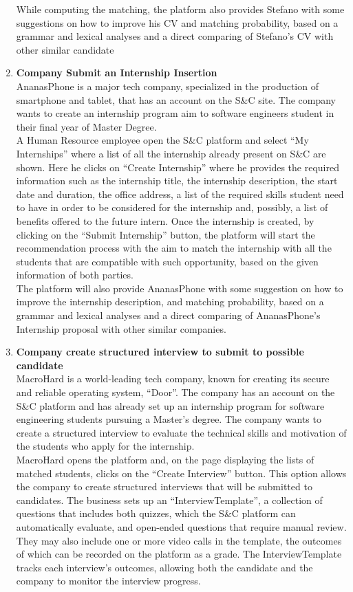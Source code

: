 \begin{enumerate}
        While computing the matching, the platform also provides Stefano with some suggestions on how to improve his CV and matching probability, based on a grammar and lexical analyses and a direct comparing of Stefano's CV with other similar candidate
    \item \textbf{\textcolor{titleColor}{Company Submit an Internship Insertion}}\\
        AnanasPhone is a major tech company, specialized in the production of smartphone and tablet, that has an account on the S\&C site. The company wants to create an internship program aim to software engineers student in their final year of Master Degree.\\
        A Human Resource employee open the S\&C platform and select “My Internships” where a list of all the internship already present on S\&C are shown. Here he clicks on “Create Internship” where he provides the required information such as the internship title, the internship description, the start date and duration, the office address, a list of the required skills student need to have in order to be considered for the internship and, possibly, a list of benefits offered to the future intern. Once the internship is created, by clicking on the “Submit Internship” button, the platform will start the recommendation process with the aim to match the internship with all the students that are compatible with such opportunity, based on the given information of both parties.\\
        The platform will also provide AnanasPhone with some suggestion on how to improve the internship description, and matching probability, based on a grammar and lexical analyses and a direct comparing of AnanasPhone's Internship proposal with other similar companies.
    \item \textbf{\textcolor{titleColor}{Company create structured interview to submit to possible candidate}}\\
        MacroHard is a world-leading tech company, known for creating its secure and reliable operating system, “Door”. The company has an account on the S\&C platform and has already set up an internship program for software engineering students pursuing a Master’s degree. The company wants to create a structured interview to evaluate the technical skills and motivation of the students who apply for the internship.\\
        MacroHard opens the platform and, on the page displaying the lists of matched students, clicks on the “Create Interview” button. This option allows the company to create structured interviews that will be submitted to candidates. The business sets up an “InterviewTemplate”, a collection of questions that includes both quizzes, which the S\&C platform can automatically evaluate, and open-ended questions that require manual review. They may also include one or more video calls in the template, the outcomes of which can be recorded on the platform as a grade. The InterviewTemplate tracks each interview’s outcomes, allowing both the candidate and the company to monitor the interview progress.\\

\end{enumerate}
